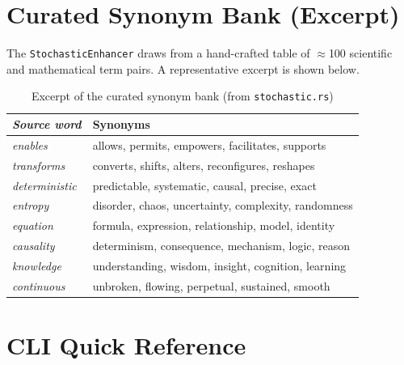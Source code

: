 \documentclass[11pt,a4paper]{article}
\begin{document}
\section{Curated Synonym Bank (Excerpt)}
\label{app:synonyms}

The \texttt{StochasticEnhancer} draws from a hand-crafted table of $\approx$100 scientific and mathematical term pairs. A representative excerpt is shown below.

\begin{table}[H]
\centering
\caption{Excerpt of the curated synonym bank (from \texttt{stochastic.rs})}
\label{tab:synonyms}
\renewcommand{\arraystretch}{1.3}
\begin{tabular}{@{}>{\itshape}l p{9.5cm}@{}}
\toprule
\rowcolor{lmmHeaderBg}
{\color{white}\normalfont\textbf{Source word}} &
{\color{white}\textbf{Synonyms}} \\
\midrule
\rowcolor{white}     enables       & allows, permits, empowers, facilitates, supports \\
\rowcolor{lmmRowAlt} transforms    & converts, shifts, alters, reconfigures, reshapes \\
\rowcolor{white}     deterministic & predictable, systematic, causal, precise, exact \\
\rowcolor{lmmRowAlt} entropy       & disorder, chaos, uncertainty, complexity, randomness \\
\rowcolor{white}     equation      & formula, expression, relationship, model, identity \\
\rowcolor{lmmRowAlt} causality     & determinism, consequence, mechanism, logic, reason \\
\rowcolor{white}     knowledge     & understanding, wisdom, insight, cognition, learning \\
\rowcolor{lmmRowAlt} continuous    & unbroken, flowing, perpetual, sustained, smooth \\
\bottomrule
\end{tabular}
\end{table}

\section{CLI Quick Reference}
\label{app:cli}
\end{document}
